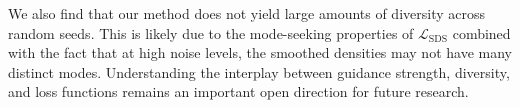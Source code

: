 \documentclass{article} %
\newcommand{\ldist}[0]{\mathcal{L}_{\text{SDS}}}
\begin{document}
We also find that our method does not yield large amounts of diversity across random seeds. This is likely due to the mode-seeking properties of $\ldist$ combined with the fact that at high noise levels, the smoothed densities may not have many distinct modes. Understanding the interplay between guidance strength, diversity, and loss functions remains an important open direction for future research.

\end{document}
